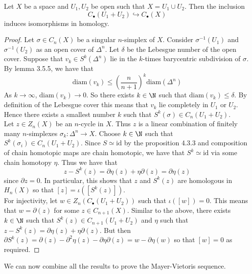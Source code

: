 \documentclass[a4paper]{article}
\begin{document}
\begin{prp}{}{} Let $X$ be a space and $U_1,U_2$ be open such that $X=U_1\cup U_2$. Then the inclusion $$C_\bullet(U_1+U_2)\hookrightarrow C_\bullet(X)$$ induces isomorphisms in homology. 
\begin{proof}
Let $\sigma\in C_n(X)$ be a singular $n$-simplex of $X$. Consider $\sigma^{-1}(U_1)$ and $\sigma^{-1}(U_2)$ as an open cover of $\Delta^n$. Let $\delta$ be the Lebesgue number of the open cover. Suppose that $v_k\in S^k(\Delta^n)$ lie in the $k$-times barycentric subdivision of $\sigma$. By lemma 3.5.5, we have that $$\text{diam}(v_k)\leq\left(\frac{n}{n+1}\right)^k\text{diam}(\Delta^n)$$ As $k\to\infty$, $\text{diam}(v_k)\to 0$. So there exists $k\in\N$ such that $\text{diam}(v_k)\leq\delta$. By definition of the Lebesgue cover this means that $v_k$ lie completely in $U_1$ or $U_2$. Hence there exists a smallest number $k$ such that $S^k(\sigma)\in C_n(U_1+U_2)$. \\

Let $z\in Z_n(X)$ be an $n$-cycle in $X$. Thus $z$ is a linear combination of finitely many $n$-simplexes $\sigma_k:\Delta^n\to X$. Choose $k\in\N$ such that $S^k(\sigma_i)\in C_n(U_1+U_2)$. Since $S\simeq\text{id}$ by the proposition 4.3.3 and composition of chain homotopic maps are chain homotopic, we have that $S^k\simeq\text{id}$ via some chain homotopy $\eta$. Thus we have that $$z-S^k(z)=\partial\eta(z)+\eta\partial(z)=\partial\eta(z)$$ since $\partial z=0$. In particular, this shows that $z$ and $S^k(z)$ are homologous in $H_n(X)$ so that $[z]=\iota([S^k(z)])$. \\

For injectivity, let $w\in Z_n(C_\bullet(U_1+U_2))$ such that $\iota([w])=0$. This means that $w=\partial(z)$ for some $z\in C_{n+1}(X)$. Similar to the above, there exists $k\in\N$ such that $S^k(z)\in C_{n+1}(U_1+U_2)$ and $\eta$ such that $z-S^k(z)=\partial\eta(z)+\eta\partial(z)$. But then $\partial S^k(z)=\partial(z)-\partial^2\eta(z)-\partial\eta\partial(z)=w-\partial\eta(w)$ so that $[w]=0$ as required. 
\end{proof}
\end{prp}

We can now combine all the results to prove the Mayer-Vietoris sequence. 
\end{document}
